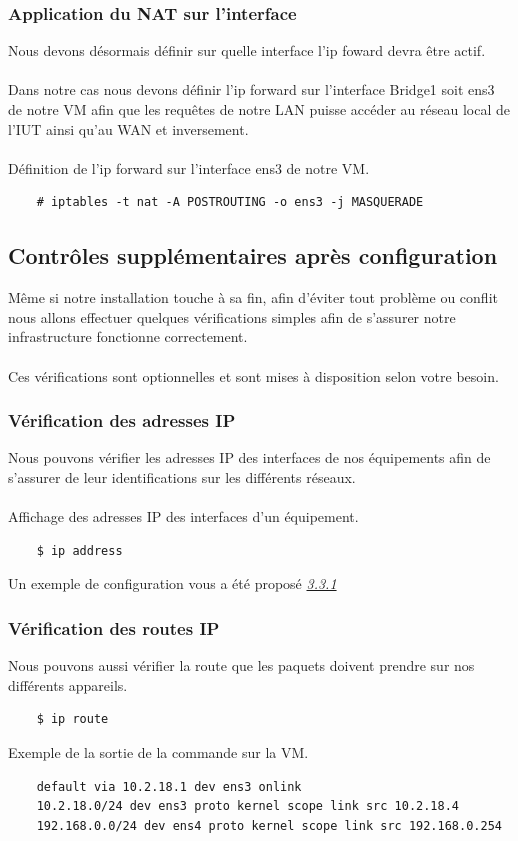 \documentclass[a4paper]{article}
\begin{document}
\subsubsection{Application du NAT sur l'interface}
Nous devons désormais définir sur quelle interface l'ip foward devra être actif.\\\\Dans notre cas nous devons définir l'ip forward sur l'interface Bridge1 soit ens3 de notre VM afin que les requêtes de notre LAN puisse accéder au réseau local de l'IUT ainsi qu'au WAN et inversement.\\\\Définition de l'ip forward sur l'interface ens3 de notre VM.
\begin{lstlisting}
    # iptables -t nat -A POSTROUTING -o ens3 -j MASQUERADE
\end{lstlisting}
\subsection{Contrôles supplémentaires après configuration}
\label{sec:ici}
Même si notre installation touche à sa fin, afin d'éviter tout problème ou conflit nous allons effectuer quelques vérifications simples afin de s'assurer notre infrastructure fonctionne correctement.\\\\Ces vérifications sont optionnelles et sont mises à disposition selon votre besoin.
\subsubsection{Vérification des adresses IP}
Nous pouvons vérifier les adresses IP des interfaces de nos équipements afin de s'assurer de leur identifications sur les différents réseaux.\\\\Affichage des adresses IP des interfaces d'un équipement.
\begin{lstlisting}
    $ ip address
\end{lstlisting}
Un exemple de configuration vous a été proposé \hyperref[sec:secip]{\textit{3.3.1}}
\subsubsection{Vérification des routes IP}
Nous pouvons aussi vérifier la route que les paquets doivent prendre sur nos différents appareils.
\begin{lstlisting}
    $ ip route
\end{lstlisting}
Exemple de la sortie de la commande sur la VM.
\begin{lstlisting}
    default via 10.2.18.1 dev ens3 onlink 
    10.2.18.0/24 dev ens3 proto kernel scope link src 10.2.18.4 
    192.168.0.0/24 dev ens4 proto kernel scope link src 192.168.0.254 
\end{lstlisting}
\end{document}
